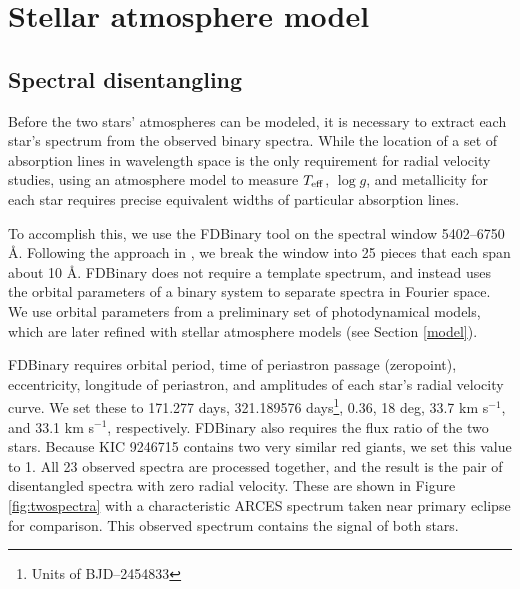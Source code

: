 \section{Stellar atmosphere model}\label{atm}

\subsection{Spectral disentangling}\label{disentangle}
Before the two stars' atmospheres can be modeled, it is necessary to extract each star's spectrum from the observed binary spectra. While the location of a set of absorption lines in wavelength space is the only requirement for radial velocity studies, using an atmosphere model to measure $T_{\rm{eff}}$, $\log g$, and metallicity for each star requires precise equivalent widths of particular absorption lines.

To accomplish this, we use the FDBinary tool \citep{ili04} on the spectral window 5402--6750 \AA. Following the approach in \citet{bec14}, we break the window into 25 pieces that each span about 10 \AA. FDBinary does not require a template spectrum, and instead uses the orbital parameters of a binary system to separate spectra in Fourier space. We use orbital parameters from a preliminary set of photodynamical models, which are later refined with stellar atmosphere models (see Section \ref{model}).

FDBinary requires orbital period, time of periastron passage (zeropoint), eccentricity, longitude of periastron, and amplitudes of each star's radial velocity curve. We set these to 171.277 days, 321.189576 days\footnote{Units of BJD--2454833}, 0.36, 18 deg, 33.7 km s$^{-1}$, and 33.1 km s$^{-1}$, respectively. FDBinary also requires the flux ratio of the two stars. Because KIC 9246715 contains two very similar red giants, we set this value to 1. All 23 observed spectra are processed together, and the result is the pair of disentangled spectra with zero radial velocity. These are shown in Figure \ref{fig:twospectra} with a characteristic ARCES spectrum taken near primary eclipse for comparison. This observed spectrum contains the signal of both stars.
